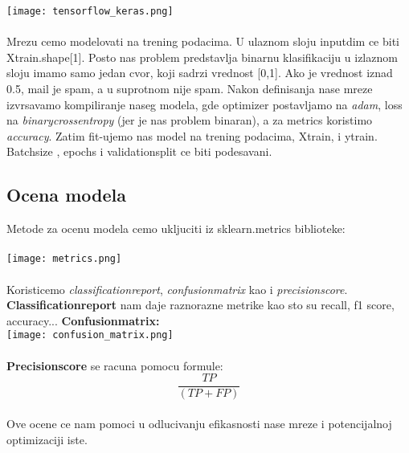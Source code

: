 \documentclass{article}
\begin{document}
\texttt{[image: tensorflow\_keras.png]}\\
\\
Mrezu cemo modelovati na trening podacima. U ulaznom sloju input\textunderscore dim ce biti X\textunderscore train.shape[1]. Posto nas problem predstavlja binarnu klasifikaciju u izlaznom sloju imamo samo jedan cvor, koji sadrzi vrednost [0,1]. Ako je vrednost iznad 0.5, mail je spam, a u suprotnom nije spam. Nakon definisanja nase mreze izvrsavamo kompiliranje naseg modela, gde optimizer postavljamo na \textit{adam}, loss na \textit{binary\textunderscore crossentropy} (jer je nas problem binaran), a za metrics koristimo \textit{accuracy}. Zatim fit-ujemo nas model na trening podacima, X\textunderscore train, i y\textunderscore train. Batch\textunderscore size , epochs i validation\textunderscore split ce biti podesavani.


\newpage
\subsection{Ocena modela}
Metode za ocenu modela cemo ukljuciti iz sklearn.metrics biblioteke:\\
\\
\texttt{[image: metrics.png]}\\
\\
Koristicemo \textit{classification\textunderscore report}, \textit{confusion\textunderscore matrix} kao i \textit{precision\textunderscore score}. \\
\textbf{Classification\textunderscore report} nam daje raznorazne metrike kao sto su recall, f1 score, accuracy...
\textbf{Confusion\textunderscore matrix:}\\
\texttt{[image: confusion\_matrix.png]}\\
\\
\textbf{Precision\textunderscore score} se racuna pomocu formule:\\
$$\frac{TP}{(TP + FP)}$$ \\
Ove ocene ce nam pomoci u odlucivanju efikasnosti nase mreze i potencijalnoj optimizaciji iste.


 \newpage
\end{document}
